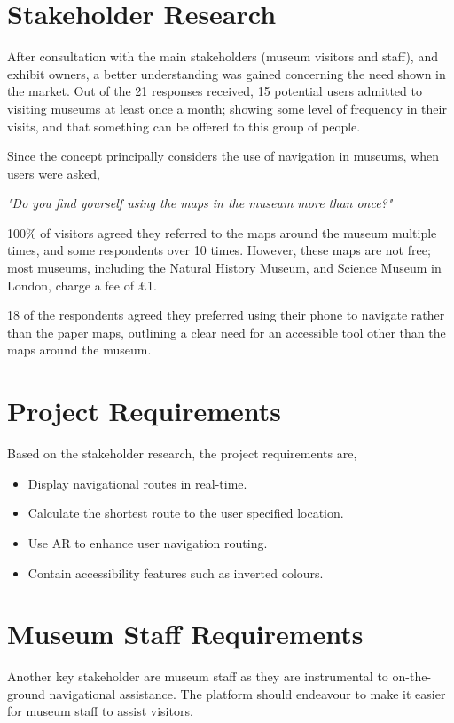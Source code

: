 
{
\section{Stakeholder Research}
After consultation with the main stakeholders (museum visitors and staff), and exhibit owners, a better understanding was gained concerning the need shown in the market. Out of the 21 responses received, 15 potential users admitted to visiting museums at least once a month; showing some level of frequency in their visits, and that something can be offered to this group of people.

Since the concept principally considers the use of navigation in museums, when users were asked, 

\begin{displayquote}
\textit{"Do you find yourself using the maps in the museum more than once?"}
\end{displayquote}

100\% of visitors agreed they referred to the maps around the museum multiple times, and some respondents over 10 times. However, these maps are not free; most museums, including the Natural History Museum, and Science Museum in London, charge a fee of £1.

18 of the respondents agreed they preferred using their phone to navigate rather than the paper maps, outlining a clear need for an accessible tool other than the maps around the museum.

\newpage
\section{Project Requirements}
Based on the stakeholder research, the project requirements are, 
\begin{itemize}
    \item Display navigational routes in real-time.
    \item Calculate the shortest route to the user specified location.
    \item Use AR to enhance user navigation routing.
    \item Contain accessibility features such as inverted colours.
\end{itemize}

\section{Museum Staff Requirements}
Another key stakeholder are museum staff as they are instrumental to on-the-ground navigational assistance. The platform should endeavour to make it easier for museum staff to assist visitors.

}
